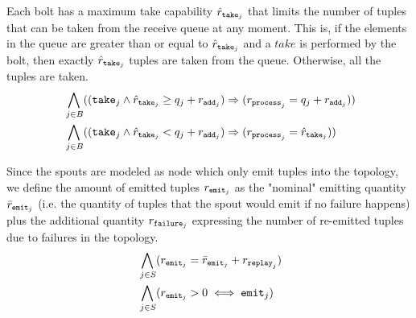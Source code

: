 Each bolt has a maximum take capability $\hat{r}_{\mathtt{take}_{j}}$ that limits the number of tuples that can be taken from the receive queue at any moment. This is, if the elements in the queue are greater than or equal to $\hat{r}_{\mathtt{take}_{j}}$ and a $take$ is performed by the bolt, then exactly $\hat{r}_{\mathtt{take}_{j}}$ tuples are taken from the queue. Otherwise, all the tuples are taken. 
\begin{align*}
%
%
& \bigwedge_{
\begin{subarray}{c}
\,j \in B
\end{subarray}
}((\ta{j} \land \rth{j} \geq q_j + \ra{j}) \Rightarrow (\rp{j} = q_j + \ra{j})) \\
%
%
%
%
& \bigwedge_{
\begin{subarray}{c}
\,j \in B
\end{subarray}
}((\ta{j} \land \rth{j} < q_j + \ra{j}) \Rightarrow (\rp{j} = \rth{j}))
%
%
\end{align*}

Since the spouts are modeled as node which only emit tuples into the topology, we define the amount of emitted tuples $r_{\mathtt{emit}_{j}}$ as the "nominal" emitting quantity $\bar{r}_{\mathtt{emit}_{j}}$ (i.e. the quantity of tuples that the spout would emit if no failure happens) plus the additional quantity $r_{\mathtt{failure}_{j}}$ expressing the number of re-emitted tuples due to failures in the topology.
\begin{align*}
%
& \bigwedge_{
\begin{subarray}{c}
\,j \in S\\
\end{subarray}
} ( \re{j} = \reb{j} + \rr{j}) \\
%
%
& \bigwedge_{
\begin{subarray}{c}
\,j \in S\\
\end{subarray}
} ( \re{j} > 0 \iff \e{j}) \\
%
%
\end{align*}






